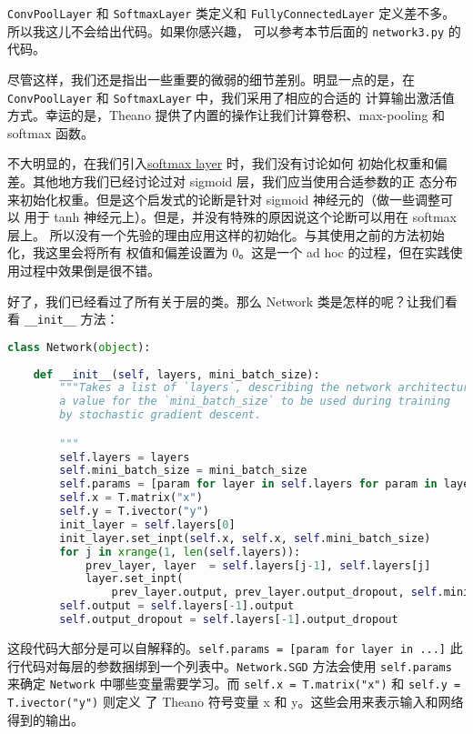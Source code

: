 \lstinline!ConvPoolLayer! 和 \lstinline!SoftmaxLayer! 类定义和
\lstinline!FullyConnectedLayer! 定义差不多。所以我这儿不会给出代码。如果你感兴趣，
可以参考本节后面的 \lstinline!network3.py! 的代码。

尽管这样，我们还是指出一些重要的微弱的细节差别。明显一点的是，在
\lstinline!ConvPoolLayer! 和 \lstinline!SoftmaxLayer! 中，我们采用了相应的合适的
计算输出激活值方式。幸运的是，Theano 提供了内置的操作让我们计算卷积、max-pooling
和 softmax 函数。

不大明显的，在我们引入\hyperref[sec:softmax]{softmax layer} 时，我们没有讨论如何
初始化权重和偏差。其他地方我们已经讨论过对 sigmoid 层，我们应当使用合适参数的正
态分布来初始化权重。但是这个启发式的论断是针对 sigmoid 神经元的（做一些调整可以
  用于 tanh 神经元上）。但是，并没有特殊的原因说这个论断可以用在 softmax 层上。
所以没有一个先验的理由应用这样的初始化。与其使用之前的方法初始化，我这里会将所有
权值和偏差设置为 $0$。这是一个 ad hoc 的过程，但在实践使用过程中效果倒是很不错。

好了，我们已经看过了所有关于层的类。那么 Network 类是怎样的呢？让我们看看
\lstinline!__init__! 方法：

\begin{lstlisting}[language=Python]
class Network(object):
    
    def __init__(self, layers, mini_batch_size):
        """Takes a list of `layers`, describing the network architecture, and
        a value for the `mini_batch_size` to be used during training
        by stochastic gradient descent.

        """
        self.layers = layers
        self.mini_batch_size = mini_batch_size
        self.params = [param for layer in self.layers for param in layer.params]
        self.x = T.matrix("x")  
        self.y = T.ivector("y")
        init_layer = self.layers[0]
        init_layer.set_inpt(self.x, self.x, self.mini_batch_size)
        for j in xrange(1, len(self.layers)):
            prev_layer, layer  = self.layers[j-1], self.layers[j]
            layer.set_inpt(
                prev_layer.output, prev_layer.output_dropout, self.mini_batch_size)
        self.output = self.layers[-1].output
        self.output_dropout = self.layers[-1].output_dropout
\end{lstlisting}

这段代码大部分是可以自解释的。\lstinline!self.params = [param for layer in ...]!
此行代码对每层的参数捆绑到一个列表中。\lstinline!Network.SGD! 方法会使用
\lstinline!self.params! 来确定 \lstinline!Network! 中哪些变量需要学习。而
\lstinline!self.x = T.matrix("x")! 和 \lstinline!self.y = T.ivector("y")! 则定义
了 Theano 符号变量 x 和 y。这些会用来表示输入和网络得到的输出。

